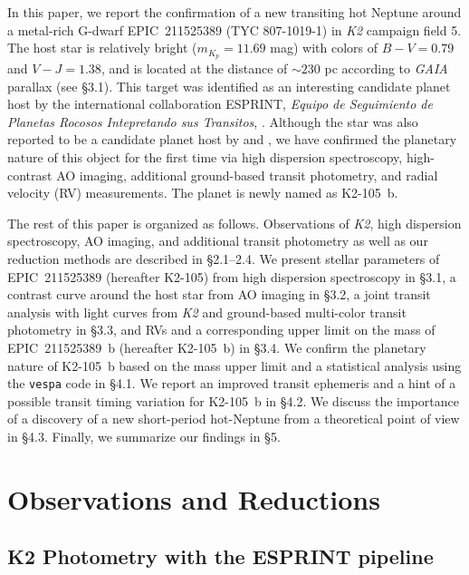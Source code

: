 \documentclass[]{pasj01}
\begin{document}
In this paper, we report the confirmation of a new transiting hot Neptune
around a metal-rich G-dwarf EPIC~211525389 (TYC 807-1019-1) in {\it K2} campaign field 5.
The host star is relatively bright ($m_{K_p} = 11.69$ mag) with colors of $B-V = 0.79$ and $V-J = 1.38$,
and is located at the distance of $\sim230$ pc according to {\it GAIA} parallax (see \S3.1).
This target was identified as an interesting candidate planet host by the 
international collaboration ESPRINT,
{\it Equipo de Seguimiento de Planetas Rocosos Intepretando sus Transitos},
\citep{2015ApJ...812..112S,2016ApJ...820...56V,2016arXiv160509180V,
2016ApJ...820...41H,2016ApJ...825...53H,2016ApJ...823..115D}.
Although the star was also reported to be a candidate planet host by
\citet{2016MNRAS.461.3399P} and \citet{2016arXiv160702339B},
we have confirmed the planetary nature of this object for the first time
via high dispersion spectroscopy, high-contrast AO imaging,
additional ground-based transit photometry,
and radial velocity (RV) measurements.
The planet is newly named as K2-105~b.

The rest of this paper is organized as follows.
Observations of {\it K2}, high dispersion spectroscopy, AO imaging, and additional
transit photometry as well as our reduction methods are described in \S2.1--2.4.
We present stellar parameters of EPIC~211525389 (hereafter K2-105)
from high dispersion spectroscopy in \S3.1,
a contrast curve around the host star from AO imaging in \S3.2,
a joint transit analysis with light curves from {\it K2} and
ground-based multi-color transit photometry in \S3.3,
and RVs and a corresponding upper limit on the mass of EPIC~211525389~b (hereafter K2-105~b) in \S3.4.
We confirm the planetary nature of K2-105~b based on the mass upper limit
and a statistical analysis using the \texttt{vespa} code \citep{2012ApJ...761....6M, 2015ascl.soft03011M}
in \S4.1.
We report an improved transit ephemeris and a hint of a possible transit timing variation
for K2-105~b in \S4.2.
We discuss the importance of a discovery of a new short-period hot-Neptune
from a theoretical point of view in \S4.3.
Finally, we summarize our findings in \S5.


\section{Observations and Reductions}

\subsection{K2 Photometry with the ESPRINT pipeline}
\end{document}
